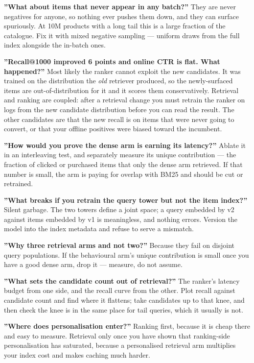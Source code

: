\documentclass[10pt,twoside]{book}
\newcommand{\csection}[1]{\par\vspace{13pt}\noindent{\sffamily\large\bfseries\color{ink}\raggedright #1\par}\vspace{4pt}}
\begin{document}
\textbf{''What about items that never appear in any batch?''} They are never negatives for anyone, so nothing ever pushes them down, and they can surface spuriously. At 10M products with a long tail this is a large fraction of the catalogue. Fix it with mixed negative sampling --- uniform draws from the full index alongside the in-batch ones.\par
\textbf{''Recall@1000 improved 6 points and online CTR is flat. What happened?''} Most likely the ranker cannot exploit the new candidates. It was trained on the distribution the \textit{old} retriever produced, so the newly-surfaced items are out-of-distribution for it and it scores them conservatively. Retrieval and ranking are coupled: after a retrieval change you must retrain the ranker on logs from the new candidate distribution before you can read the result. The other candidates are that the new recall is on items that were never going to convert, or that your offline positives were biased toward the incumbent.\par
\textbf{''How would you prove the dense arm is earning its latency?''} Ablate it in an interleaving test, and separately measure its unique contribution --- the fraction of clicked or purchased items that only the dense arm retrieved. If that number is small, the arm is paying for overlap with BM25 and should be cut or retrained.\par
\textbf{''What breaks if you retrain the query tower but not the item index?''} Silent garbage. The two towers define a joint space; a query embedded by v2 against items embedded by v1 is meaningless, and nothing errors. Version the model into the index metadata and refuse to serve a mismatch.\par
\csection{On the funnel}
\textbf{''Why three retrieval arms and not two?''} Because they fail on disjoint query populations. If the behavioural arm's unique contribution is small once you have a good dense arm, drop it --- measure, do not assume.\par
\textbf{''What sets the candidate count out of retrieval?''} The ranker's latency budget from one side, and the recall curve from the other. Plot recall against candidate count and find where it flattens; take candidates up to that knee, and then check the knee is in the same place for tail queries, which it usually is not.\par
\textbf{''Where does personalisation enter?''} Ranking first, because it is cheap there and easy to measure. Retrieval only once you have shown that ranking-side personalisation has saturated, because a personalised retrieval arm multiplies your index cost and makes caching much harder.\par
\end{document}
